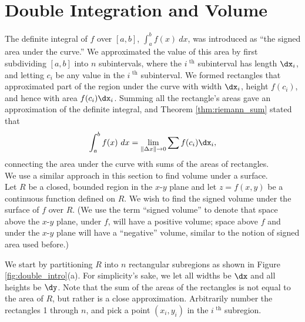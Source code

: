 \section{Double Integration and Volume}\label{sec:double_int_volume}

The definite integral of $f$ over $[a,b]$, $\int_a^b f(x)\ dx$, was introduced as ``the signed area under the curve.'' We approximated the value of this area by first subdividing $[a,b]$ into $n$ subintervals, where the $i^\text{ th}$ subinterval has length $\dx_i$, and letting $c_i$ be any value in the $i^\text{ th}$ subinterval. We formed rectangles that approximated part of the region under the curve with width $\dx_i$, height $f(c_i)$, and hence with area $f(c_i)\dx_i$. Summing all the rectangle's areas gave an approximation of the definite integral, and Theorem \ref{thm:riemann_sum} stated that
$$\int_a^bf(x)\ dx = \lim_{\|\Delta x\|\to 0}\sum f(c_i)\dx_i,$$
connecting the area under the curve with sums of the areas of rectangles.\\

We use a similar approach in this section to find volume under a surface.\\

Let $R$ be a closed, bounded region in the $x$-$y$ plane and let $z=f(x,y)$ be a continuous function defined on $R$. We wish to find the signed volume under the surface of $f$ over $R$. (We use the term ``signed volume'' to denote that space above the $x$-$y$ plane, under $f$, will have a positive volume; space above $f$ and under the $x$-$y$ plane will have a ``negative'' volume, similar to the notion of signed area used before.)

We start by partitioning $R$ into $n$ rectangular subregions as shown in Figure \ref{fig:double_intro}(a). For simplicity's sake, we let all widths be $\dx$ and all heights be $\dy$. Note that the sum of the areas of the rectangles is not equal to the area of $R$, but rather is a close approximation. Arbitrarily number the rectangles 1 through $n$, and pick a point $(x_i,y_i)$ in the $i^\text{ th}$ subregion. 

